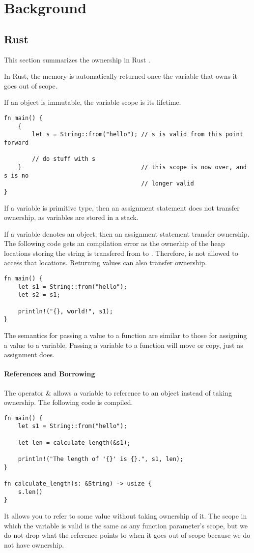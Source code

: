 \section{Background}
\subsection{Rust}
This section summarizes the ownership in Rust \cite{rust}.

In Rust, the memory is automatically returned once the variable that owns it goes out of scope. 

If an object is immutable, the variable scope is its lifetime.
\begin{lstlisting}[basicstyle=\footnotesize\ttfamily]
fn main() {
    {
        let s = String::from("hello"); // s is valid from this point forward

        // do stuff with s
    }                                  // this scope is now over, and s is no
                                       // longer valid
}
\end{lstlisting} 

If a variable is primitive type, then an assignment statement does not transfer ownership, as variables are stored in a stack.

If a variable denotes an object, then an assignment statement transfer ownership. The following code gets an compilation error as the ownerhip of the heap locations storing the string is transfered from  to . Therefore,  is not allowed to access that locations. Returning values can also transfer ownership.
\begin{lstlisting}[basicstyle=\footnotesize\ttfamily]
fn main() {
    let s1 = String::from("hello");
    let s2 = s1;

    println!("{}, world!", s1);
}
\end{lstlisting} 

The semantics for passing a value to a function are similar to those for assigning a value to a variable. Passing a variable to a function will move or copy, just as assignment does. 

\paragraph{References and Borrowing}
The operator \& allows a variable to reference to an object instead of taking ownership. The following code is compiled.
\begin{lstlisting}
fn main() {
    let s1 = String::from("hello");

    let len = calculate_length(&s1);

    println!("The length of '{}' is {}.", s1, len);
}

fn calculate_length(s: &String) -> usize {
    s.len()
}

\end{lstlisting}
It allows you to refer to some value without taking ownership of it.
The scope in which the variable  is valid is the same as any function parameter's scope, but we do not drop what the reference points to when it goes out of scope because we do not have ownership. 
